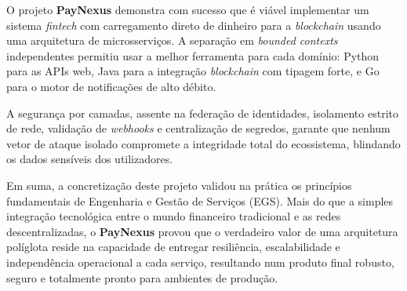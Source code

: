 \documentclass[12pt,a4paper]{article}
\begin{document}
O projeto \textbf{PayNexus} demonstra com sucesso que é viável implementar um sistema \emph{fintech} com carregamento direto de dinheiro para a \emph{blockchain} usando uma arquitetura de microsserviços. A separação em \emph{bounded contexts} independentes permitiu usar a melhor ferramenta para cada domínio: Python para as APIs web, Java para a integração \emph{blockchain} com tipagem forte, e Go para o motor de notificações de alto débito.

A segurança por camadas, assente na federação de identidades, isolamento estrito de rede, validação de \emph{webhooks} e centralização de segredos, garante que nenhum vetor de ataque isolado compromete a integridade total do ecossistema, blindando os dados sensíveis dos utilizadores.

Em suma, a concretização deste projeto validou na prática os princípios fundamentais de Engenharia e Gestão de Serviços (EGS). Mais do que a simples integração tecnológica entre o mundo financeiro tradicional e as redes descentralizadas, o \textbf{PayNexus} provou que o verdadeiro valor de uma arquitetura políglota reside na capacidade de entregar resiliência, escalabilidade e independência operacional a cada serviço, resultando num produto final robusto, seguro e totalmente pronto para ambientes de produção.


\end{document}
